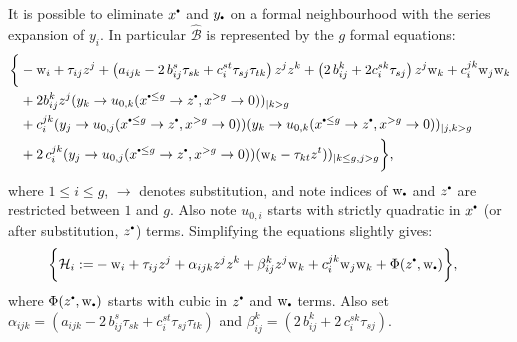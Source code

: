     It is possible to eliminate \(x^{\sbt}\) and \(y_{\sbt}\) on a formal neighbourhood with the series expansion of \(y_i\). In particular \( \widehat{\mathcal{B}}\) is represented by the \(g\) formal equations:
    \begin{align*}  
    \bigg\{ &-\w_i + \tau_{ij} z^j +  \left(a_{ijk} - 2 \, b_{ij}^s \tau_{sk} + c_i^{st} \tau_{sj}\tau_{tk} \right) z^j z^k + \left(2 \,b_{ij}^k + 2 c_{i}^{sk} \tau_{sj}  \right) z^j  \w_k  + c_{i}^{jk} \w_j \w_k  \\
    & +  2 b_{ij}^k z^j ( y_{k} \rightarrow u_{0,k}(x^{\sbt \leq g} \rightarrow z^{\sbt}, x^{>g} \rightarrow 0  ))_{|k > g}  \\
    &+ c_{i}^{jk} (y_{j} \rightarrow u_{0,j}(x^{\sbt \leq g} \rightarrow z^{\sbt}, x^{>g} \rightarrow  0  )) (y_{k} \rightarrow u_{0,k}(x^{\sbt \leq g} \rightarrow z^{\sbt}, x^{>g} \rightarrow 0  ))_{|j,k > g}   \\
    &+ 2 \, c_{i}^{jk} (y_{j} \rightarrow u_{0,j}(x^{\sbt \leq g} \rightarrow z^{\sbt}, x^{>g} \rightarrow 0  )) (\w_k -\tau_{kt}z^t ))_{|k\leq g, j>g} 
    \bigg\},
    \end{align*}
    where \( 1 \leq i \leq g \), \( \rightarrow \) denotes substitution, and note indices of \( \w_{\sbt}\) and \(z^{\sbt}\) are restricted between \(1\) and \(g\). Also note \(u_{0,i}\) starts with strictly quadratic in \(x^{\sbt}\) (or after substitution, \( z^{\sbt}\)) terms. Simplifying the equations slightly gives: 
     \begin{align*}  
    \bigg\{ \mathcal{H}_i := &-\w_i + \tau_{ij} z^j +  \alpha_{ijk} z^j z^k + \beta_{ij}^k z^j  \w_k  + c_{i}^{jk} \w_j \w_k  + \Phi ( z^{\sbt} , \w_{\sbt} )
    \bigg\},
    \end{align*}    
    where \( \Phi(z^{\sbt},\w_{\sbt}) \) starts with cubic in \(z^{\sbt}\) and \(\w_{\sbt}\) terms. Also set \( \alpha_{ijk} = \left(a_{ijk} - 2 \, b_{ij}^s \tau_{sk} + c_i^{st} \tau_{sj}\tau_{tk} \right)\) and \(\beta_{ij}^k= \left(2 \,b_{ij}^k + 2\, c_{i}^{sk} \tau_{sj}  \right)\).
    
